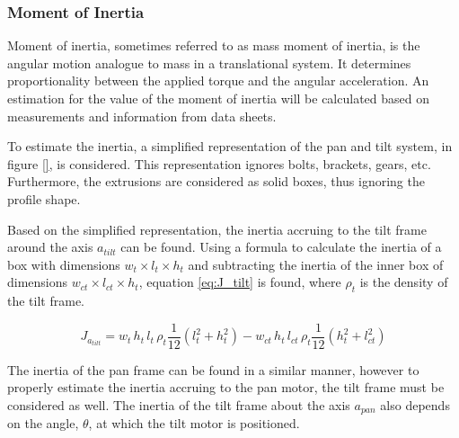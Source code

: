 \documentclass[../../main.tex]{subfiles}
\begin{document}
\subsubsection*{Moment of Inertia}
Moment of inertia, sometimes referred to as mass moment of inertia, is the angular motion analogue to mass in a translational system. It determines proportionality between the applied torque and the angular acceleration. An estimation for the value of the moment of inertia will be calculated based on measurements and information from data sheets. 

To estimate the inertia, a simplified representation of the pan and tilt system, in figure \ref{}, is considered. This representation ignores bolts, brackets, gears, etc. Furthermore, the extrusions are considered as solid boxes, thus ignoring the profile shape.

Based on the simplified representation, the inertia accruing to the tilt frame around the axis $a_{tilt}$ can be found. Using a formula to calculate the inertia of a box with dimensions $w_t\times l_t\times h_t$ and subtracting the inertia of the inner box of dimensions $w_{ct}\times l_{ct}\times h_t$, equation \ref{eq:J_tilt} is found, where $\rho_t$ is the density of the tilt frame.

\begin{equation} \label{eq:J_tilt}
    J_{a_{tilt}} =  w_{t} \,h_{t}\, l_{t}\,\rho_{t}\frac{1}{12}(l_{t}^2+h_{t}^2)-w_{ct}\, h_{t} \, l_{ct} \, \rho_{t}\frac{1}{12}(h_{t}^2+l_{ct}^2)
\end{equation}

The inertia of the pan frame can be found in a similar manner, however to properly estimate the inertia accruing to the pan motor, the tilt frame must be considered as well. The inertia of the tilt frame about the axis $a_{pan}$ also depends on the angle, $\theta$, at which the tilt motor is positioned.
\end{document}
